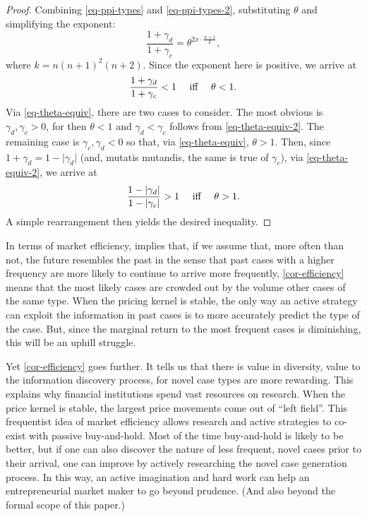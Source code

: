 \documentclass[12pt,a4paper,twoside]{article}
\begin{document}
\begin{proof}
  Combining \cref{eq-ppi-types} and \cref{eq-ppi-types-2}, substituting
  $\theta$ and simplifying the exponent:
  \begin{equation}\label{eq-ppi-ratio}
    \frac{1 + \gamma_d}{1 + \gamma_c} = \theta^{2x \cdot \frac{n+1}{k}},
  \end{equation}
  where $k = n(n+1)^2(n+2)$. Since the exponent here is positive, we arrive at
  \begin{equation}\label{eq-theta-equiv-2}
    \text{$\frac{1 + \gamma_d}{1 + \gamma_c} < 1$ \quad iff \quad $\theta <
    1$.}
  \end{equation}
  Via \cref{eq-theta-equiv}, there are two cases to consider. The most obvious
  is $\gamma_d, \gamma_c > 0$, for then $\theta < 1$ and $\gamma_d < \gamma_c$
  follows from \cref{eq-theta-equiv-2}. The remaining case is $\gamma_c,
  \gamma_d < 0$ so that, via \cref{eq-theta-equiv}, $\theta > 1$. Then, since
  $1 + \gamma_d = 1 - \lvert \gamma_d \rvert$ (and, mutatis mutandis, the same
  is true of $\gamma_c$), via \cref{eq-theta-equiv-2}, we arrive at
  \begin{equation*}
    \text{$\frac{1 - \lvert \gamma_d \rvert}{1 - \lvert \gamma_c \rvert} > 1$
    \quad iff \quad $\theta > 1$.}
  \end{equation*}
A simple rearrangement then yields the desired inequality.
\end{proof}
In terms of market efficiency, implies that, if we assume that, more often than
not, the future resembles the past in the sense that past cases with a higher
frequency are more likely to continue to arrive more frequently,
\cref{cor-efficiency} means that the most likely cases are crowded out by the
volume other cases of the same type.  When the pricing kernel is stable, the
only way an active strategy can exploit the information in past cases is to
more accurately predict the type of the case. But, since the marginal return to
the most frequent cases is diminishing, this will be an uphill struggle.

Yet \cref{cor-efficiency} goes further. It tells us that there is value in
diversity, value to the information discovery process, for novel case types are
more rewarding. This explains why financial institutions spend vast resources
on research. When the price kernel is stable, the largest price movements come
out of ``left field''.  This frequentist idea of market efficiency allows
research and active strategies to co-exist with passive buy-and-hold. Most of
the time buy-and-hold is likely to be better, but if one can also discover the
nature of less frequent, novel cases prior to their arrival, one can improve by
actively researching the novel case generation process.  In this way, an active
imagination and hard work can help an entrepreneurial market maker to go beyond
prudence. (And also beyond the formal scope of this paper.) 
\end{document}
